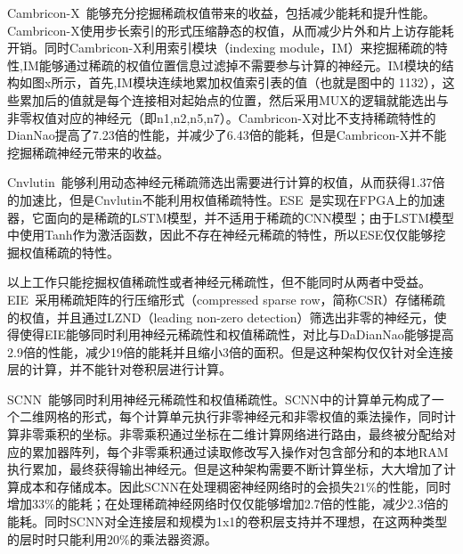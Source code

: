 Cambricon-X~\cite{zhang2016cambricon}能够充分挖掘稀疏权值带来的收益，包括减少能耗和提升性能。Cambricon-X使用步长索引的形式压缩静态的权值，从而减少片外和片上访存能耗开销。同时Cambricon-X利用索引模块（indexing module，IM）来挖掘稀疏的特性,IM能够通过稀疏的权值位置信息过滤掉不需要参与计算的神经元。IM模块的结构如图x所示，首先,IM模块连续地累加权值索引表的值（也就是图中的 1132），这些累加后的值就是每个连接相对起始点的位置，然后采用MUX的逻辑就能选出与非零权值对应的神经元（即n1,n2,n5,n7）。Cambricon-X对比不支持稀疏特性的DianNao提高了7.23倍的性能，并减少了6.43倍的能耗，但是Cambricon-X并不能挖掘稀疏神经元带来的收益。

Cnvlutin~\cite{albericio2016cnvlutin}能够利用动态神经元稀疏筛选出需要进行计算的权值，从而获得1.37倍的加速比，但是Cnvlutin不能利用权值稀疏特性。ESE~\cite{han2017ese}是实现在FPGA上的加速器，它面向的是稀疏的LSTM模型，并不适用于稀疏的CNN模型；由于LSTM模型中使用Tanh作为激活函数，因此不存在神经元稀疏的特性，所以ESE仅仅能够挖掘权值稀疏的特性。

以上工作只能挖掘权值稀疏性或者神经元稀疏性，但不能同时从两者中受益。EIE~\cite{han2016eie}采用稀疏矩阵的行压缩形式（compressed sparse row，简称CSR）存储稀疏的权值，并且通过LZND（leading non-zero detection）筛选出非零的神经元，使得使得EIE能够同时利用神经元稀疏性和权值稀疏性，对比与DaDianNao能够提高2.9倍的性能，减少19倍的能耗并且缩小3倍的面积。但是这种架构仅仅针对全连接层的计算，并不能针对卷积层进行计算。

SCNN~\cite{angshuman2017scnn}能够同时利用神经元稀疏性和权值稀疏性。SCNN中的计算单元构成了一个二维网格的形式，每个计算单元执行非零神经元和非零权值的乘法操作，同时计算非零乘积的坐标。非零乘积通过坐标在二维计算网络进行路由，最终被分配给对应的累加器阵列，每个非零乘积通过读取修改写入操作对包含部分和的本地RAM执行累加，最终获得输出神经元。但是这种架构需要不断计算坐标，大大增加了计算成本和存储成本。因此SCNN在处理稠密神经网络时的会损失$21\%$的性能，同时增加$33\%$的能耗；在处理稀疏神经网络时仅仅能够增加2.7倍的性能，减少2.3倍的能耗。同时SCNN对全连接层和规模为1x1的卷积层支持并不理想，在这两种类型的层时时只能利用$20\%$的乘法器资源。
 
